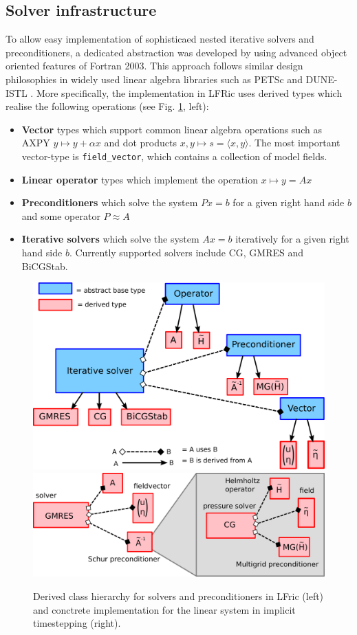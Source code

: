 \documentclass[times]{elsarticle}
\begin{document}
\subsection{Solver infrastructure}
To allow easy implementation of sophisticaed nested iterative solvers and preconditioners, a dedicated abstraction was developed by using advanced object oriented features of Fortran 2003. This approach follows similar design philosophies in widely used linear algebra libraries such as PETSc \cite{Balay1997,Balay2018} and DUNE-ISTL \cite{Blatt2007}. More specifically, the implementation in LFRic uses derived types which realise the following operations (see Fig. \ref{fig:class_hierarchy}, left):
\begin{itemize}
\item \textbf{Vector} types which support common linear algebra operations such as AXPY $y\mapsto y+\alpha x$ and dot products $x,y\mapsto s = \langle x,y\rangle$. The most important vector-type is \texttt{field\_vector}, which contains a collection of model fields.
\item \textbf{Linear operator} types which implement the operation $x\mapsto y=Ax$
\item \textbf{Preconditioners} which solve the system $Px=b$ for a
  given right hand side $b$ and some operator $P\approx A$
\item \textbf{Iterative solvers} which solve the system $Ax=b$ iteratively for a given right hand side $b$. Currently supported solvers include CG, GMRES and BiCGStab.
\end{itemize}
\begin{figure}
  \begin{center}
    \includegraphics[width=0.45\linewidth]{class_hierarchy.pdf}
    \hfill
    \includegraphics[width=0.45\linewidth]{class_concrete.pdf}
    \caption{Derived class hierarchy for solvers and preconditioners in LFric (left) and conctrete implementation for the linear system in implicit timestepping (right).}
    \label{fig:class_hierarchy}
  \end{center}
\end{figure}
\end{document}
